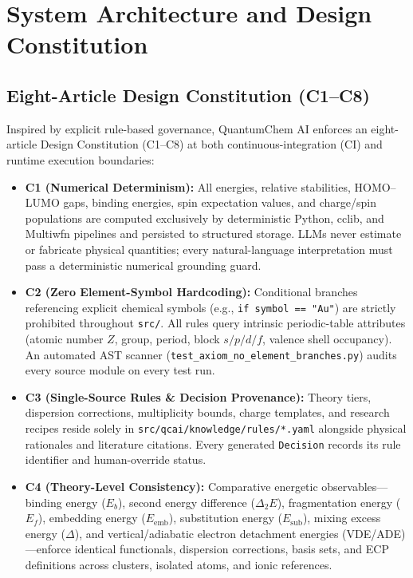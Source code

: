 \documentclass[journal=jcisd8,manuscript=article]{achemso}
\begin{document}
\section{System Architecture and Design Constitution}

\subsection{Eight-Article Design Constitution (C1--C8)}

Inspired by explicit rule-based governance,\cite{bai2022constitutional} QuantumChem AI enforces an eight-article Design Constitution (C1--C8) at both continuous-integration (CI) and runtime execution boundaries:
\begin{itemize}
  \item \textbf{C1 (Numerical Determinism):} All energies, relative stabilities, HOMO--LUMO gaps, binding energies, spin expectation values, and charge/spin populations are computed exclusively by deterministic Python, cclib, and Multiwfn pipelines and persisted to structured storage. LLMs never estimate or fabricate physical quantities; every natural-language interpretation must pass a deterministic numerical grounding guard.
  \item \textbf{C2 (Zero Element-Symbol Hardcoding):} Conditional branches referencing explicit chemical symbols (e.g., \texttt{if symbol == "Au"}) are strictly prohibited throughout \texttt{src/}. All rules query intrinsic periodic-table attributes (atomic number $Z$, group, period, block $s/p/d/f$, valence shell occupancy). An automated AST scanner (\texttt{test\_axiom\_no\_\allowbreak{}element\_branches.py}) audits every source module on every test run.
  \item \textbf{C3 (Single-Source Rules \& Decision Provenance):} Theory tiers, dispersion corrections, multiplicity bounds, charge templates, and research recipes reside solely in \texttt{src/qcai/knowledge/rules/*.yaml} alongside physical rationales and literature citations. Every generated \texttt{Decision} records its rule identifier and human-override status.
  \item \textbf{C4 (Theory-Level Consistency):} Comparative energetic observables---binding energy ($E_b$), second energy difference ($\Delta_2 E$), fragmentation energy ($E_f$), embedding energy ($E_{\text{emb}}$), substitution energy ($E_{\text{sub}}$), mixing excess energy ($\Delta$), and vertical/adiabatic electron detachment energies (VDE/ADE)---enforce identical functionals, dispersion corrections, basis sets, and ECP definitions across clusters, isolated atoms, and ionic references.

\end{itemize}
\end{document}
